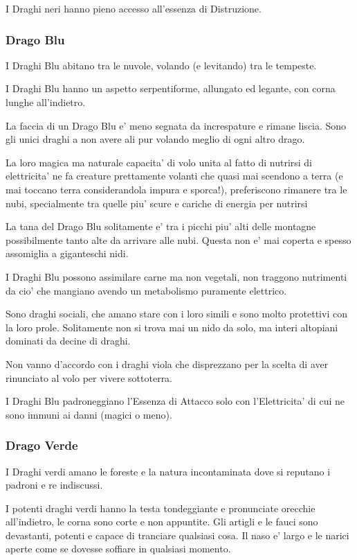 \documentclass[a4paper,11pt,twoside,openany]{book}
\begin{document}
I Draghi neri hanno pieno accesso all'essenza di Distruzione.


\subsubsection{Drago Blu} 

I Draghi Blu abitano tra le nuvole, volando (e levitando) tra le tempeste.

I Draghi Blu hanno un aspetto serpentiforme, allungato ed legante, con corna lunghe all'indietro.

La faccia di un Drago Blu e' meno segnata da increspature e rimane liscia.
Sono gli unici draghi a non avere ali pur volando meglio di ogni altro drago.

La loro magica ma naturale capacita' di volo unita al fatto di nutrirsi di elettricita' ne fa creature prettamente volanti che quasi mai scendono a terra (e mai toccano terra considerandola impura e sporca!), preferiscono rimanere tra le nubi, specialmente tra quelle piu' scure e cariche di energia per nutrirsi

La tana del Drago Blu solitamente e' tra i picchi piu' alti delle montagne possibilmente tanto alte da arrivare alle nubi. Questa non e' mai coperta e spesso assomiglia a giganteschi nidi.

I Draghi Blu possono assimilare carne ma non vegetali, non traggono nutrimenti da cio' che mangiano avendo un metabolismo puramente elettrico.

Sono draghi sociali, che amano stare con i loro simili e sono molto protettivi con la loro prole.
Solitamente non si trova mai un nido da solo, ma interi altopiani dominati da decine di draghi.

Non vanno d'accordo con i draghi viola che disprezzano per la scelta di aver rinunciato al volo per vivere sottoterra.

I Draghi Blu padroneggiano l'Essenza di Attacco solo con l'Elettricita' di cui ne sono immuni ai danni (magici o meno).


\subsubsection{Drago Verde} 

I Draghi verdi amano le foreste e la natura incontaminata dove si reputano i padroni e re indiscussi.

I potenti draghi verdi hanno la testa tondeggiante e pronunciate orecchie all'indietro, le corna sono corte e non appuntite.
Gli artigli e le fauci sono devastanti, potenti e capace di tranciare qualsiasi cosa.
Il naso e' largo e le narici aperte come se dovesse soffiare in qualsiasi momento.
\end{document}
